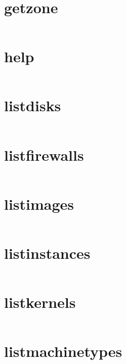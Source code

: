 \section{getzone}
\begin{lstlisting}[language=Bash]
\end{lstlisting}

\section{help}
\begin{lstlisting}[language=Bash]
\end{lstlisting}

\section{listdisks}
\begin{lstlisting}[language=Bash]
\end{lstlisting}

\section{listfirewalls}
\begin{lstlisting}[language=Bash]
\end{lstlisting}

\section{listimages}
\begin{lstlisting}[language=Bash]
\end{lstlisting}

\section{listinstances}
\begin{lstlisting}[language=Bash]
\end{lstlisting}

\section{listkernels}
\begin{lstlisting}[language=Bash]
\end{lstlisting}

\section{listmachinetypes}
\begin{lstlisting}[language=Bash]
\end{lstlisting}

